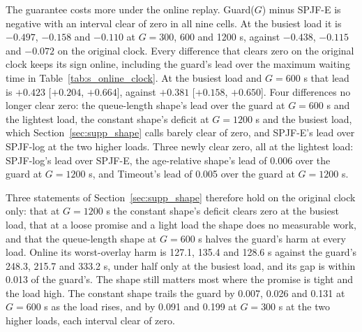\documentclass[mathematics,supfile,submit,moreauthors]{Definitions/mdpi}
\newcommand{\devnum}[1]{#1}
\begin{document}
The guarantee costs more under the online replay. Guard($G$) minus SPJF-E is negative with
an interval clear of zero in all nine cells. At the busiest load it is
\devnum{$-0.497$}, \devnum{$-0.158$} and \devnum{$-0.110$} at $G = 300$, 600 and 1200 s,
against \devnum{$-0.438$}, \devnum{$-0.115$} and \devnum{$-0.072$} on the original clock.
Every difference that clears zero on the original clock keeps its sign online, including the
guard's lead over the maximum waiting time in Table~\ref{tab:s_online_clock}. At the busiest
load and $G = 600$ s that lead is \devnum{$+0.423$ [$+0.204$, $+0.664$]}, against
\devnum{$+0.381$ [$+0.158$, $+0.650$]}. Four differences no longer clear zero: the
queue-length shape's lead over the guard at $G = 600$ s and the lightest load, the constant
shape's deficit at $G = 1200$ s and the busiest load, which Section~\ref{sec:supp_shape}
calls barely clear of zero, and SPJF-E's lead over SPJF-log at the two higher loads. Three
newly clear zero, all at the lightest load: SPJF-log's lead over SPJF-E, the age-relative
shape's lead of \devnum{0.006} over the guard at $G = 1200$ s, and Timeout's lead of
\devnum{0.005} over the guard at $G = 1200$ s.

Three statements of Section~\ref{sec:supp_shape} therefore hold on the original clock only:
that at $G = 1200$ s the constant shape's deficit clears zero at the busiest load, that at a
loose promise and a light load the shape does no measurable work, and that the queue-length
shape at $G = 600$ s halves the guard's harm at every load. Online its worst-overlay harm is
\devnum{127.1}, \devnum{135.4} and \devnum{128.6} s against the guard's \devnum{248.3},
\devnum{215.7} and \devnum{333.2} s, under half only at the busiest load, and its gap is
within \devnum{0.013} of the guard's. The shape still matters most where the promise is tight
and the load high. The constant shape trails the guard by \devnum{0.007}, \devnum{0.026} and
\devnum{0.131} at $G = 600$ s as the load rises, and by \devnum{0.091} and \devnum{0.199} at
$G = 300$ s at the two higher loads, each interval clear of zero.
\end{document}
